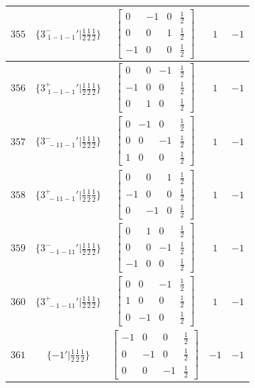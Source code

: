 \documentclass[fleqn,8pt]{jsarticle}
\begin{document}
\begin{longtable}{ccccc}
$ 355 $ & $ \{3^{-}_{\,\,1-1-1}{}'|\frac{1}{2} \frac{1}{2} \frac{1}{2}\} $ & $ \begin{bmatrix} 0 & -1 & 0 & \frac{1}{2} \\ 0 & 0 & 1 & \frac{1}{2} \\ -1 & 0 & 0 & \frac{1}{2} \end{bmatrix} $ & $ 1 $ & $ -1 $ \\ \hline
$ 356 $ & $ \{3^{+}_{\,\,1-1-1}{}'|\frac{1}{2} \frac{1}{2} \frac{1}{2}\} $ & $ \begin{bmatrix} 0 & 0 & -1 & \frac{1}{2} \\ -1 & 0 & 0 & \frac{1}{2} \\ 0 & 1 & 0 & \frac{1}{2} \end{bmatrix} $ & $ 1 $ & $ -1 $ \\ \hline
$ 357 $ & $ \{3^{-}_{\,\,-11-1}{}'|\frac{1}{2} \frac{1}{2} \frac{1}{2}\} $ & $ \begin{bmatrix} 0 & -1 & 0 & \frac{1}{2} \\ 0 & 0 & -1 & \frac{1}{2} \\ 1 & 0 & 0 & \frac{1}{2} \end{bmatrix} $ & $ 1 $ & $ -1 $ \\ \hline
$ 358 $ & $ \{3^{+}_{\,\,-11-1}{}'|\frac{1}{2} \frac{1}{2} \frac{1}{2}\} $ & $ \begin{bmatrix} 0 & 0 & 1 & \frac{1}{2} \\ -1 & 0 & 0 & \frac{1}{2} \\ 0 & -1 & 0 & \frac{1}{2} \end{bmatrix} $ & $ 1 $ & $ -1 $ \\ \hline
$ 359 $ & $ \{3^{-}_{\,\,-1-11}{}'|\frac{1}{2} \frac{1}{2} \frac{1}{2}\} $ & $ \begin{bmatrix} 0 & 1 & 0 & \frac{1}{2} \\ 0 & 0 & -1 & \frac{1}{2} \\ -1 & 0 & 0 & \frac{1}{2} \end{bmatrix} $ & $ 1 $ & $ -1 $ \\ \hline
$ 360 $ & $ \{3^{+}_{\,\,-1-11}{}'|\frac{1}{2} \frac{1}{2} \frac{1}{2}\} $ & $ \begin{bmatrix} 0 & 0 & -1 & \frac{1}{2} \\ 1 & 0 & 0 & \frac{1}{2} \\ 0 & -1 & 0 & \frac{1}{2} \end{bmatrix} $ & $ 1 $ & $ -1 $ \\ \hline
$ 361 $ & $ \{-1{}'|\frac{1}{2} \frac{1}{2} \frac{1}{2}\} $ & $ \begin{bmatrix} -1 & 0 & 0 & \frac{1}{2} \\ 0 & -1 & 0 & \frac{1}{2} \\ 0 & 0 & -1 & \frac{1}{2} \end{bmatrix} $ & $ -1 $ & $ -1 $ \\ \hline

\end{longtable}
\end{document}
